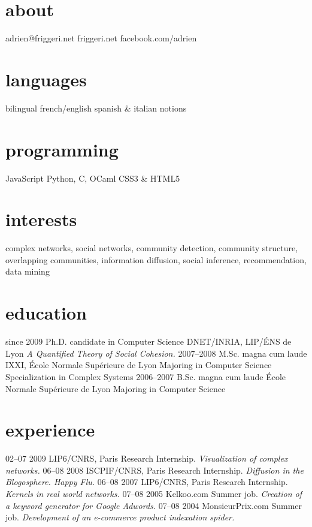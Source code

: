 \documentclass{cv}
\begin{document}

\begin{aside}
  \section{about}
    adrien@friggeri.net
    friggeri.net
    facebook.com/adrien
  \section{languages}
    bilingual french/english
    spanish \& italian notions
  \section{programming}
    JavaScript
    Python, C, OCaml
    CSS3 \& HTML5
\end{aside}

\section{interests}

complex networks, social networks, community detection, community structure,
overlapping communities, information diffusion, social inference, 
recommendation, data mining

\section{education}

\begin{entrylist}
  \entry
    {since 2009}
    {Ph.D. {\normalfont candidate in Computer Science}}
    {DNET/INRIA, LIP/ÉNS de Lyon}
    {\emph{A Quantified Theory of Social Cohesion.}}
  \entry
    {2007–2008}
    {M.Sc. magna cum laude}
    {IXXI, École Normale Supérieure de Lyon}
    {Majoring in Computer Science\\
    Specialization in Complex Systems}
  \entry
    {2006–2007}
    {B.Sc. magna cum laude}
    {École Normale Supérieure de Lyon}
    {Majoring in Computer Science}
\end{entrylist}

\section{experience}

\begin{entrylist}
  \entry
    {02–07 2009}
    {LIP6/CNRS, Paris}
    {Research Internship.}
    {\emph{Visualization of complex networks.}}
  \entry
    {06–08 2008}
    {ISCPIF/CNRS, Paris}
    {Research Internship.}
    {\emph{Diffusion in the Blogosphere. Happy Flu.}}
  \entry
    {06–08 2007}
    {LIP6/CNRS, Paris}
    {Research Internship.}
    {\emph{Kernels in real world networks.}}
  \entry
    {07–08 2005}
    {Kelkoo.com}
    {Summer job.}
    {\emph{Creation of a keyword generator for Google Adwords.}}
  \entry
    {07–08 2004}
    {MonsieurPrix.com}
    {Summer job.}
    {\emph{Development of an e-commerce product indexation spider.}}
\end{entrylist}
\end{document}
